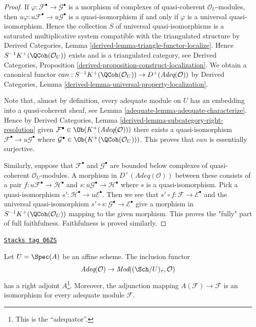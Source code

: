 \begin{proof}

If $\varphi : \mathcal{F}^\bullet \to \mathcal{G}^\bullet$
is a morphism of complexes of quasi-coherent
$\mathcal{O}_U$-modules, then $u\varphi : u\mathcal{F}^\bullet \to
u\mathcal{G}^\bullet$ is a quasi-isomorphism if and only if $\varphi$ is
a universal quasi-isomorphism. Hence the collection $S$
of universal quasi-isomorphisms is a saturated multiplicative
system compatible with the triangulated structure by
Derived Categories, Lemma \ref{derived-lemma-triangle-functor-localize}.
Hence $S^{-1}K^+(\QCoh(\mathcal{O}_U))$ exists and is a
triangulated category, see
Derived Categories, Proposition
\ref{derived-proposition-construct-localization}.
We obtain a canonical functor
$can : S^{-1}K^+(\QCoh(\mathcal{O}_U)) \to
D^{+}(\textit{Adeq}(\mathcal{O}))$ by
Derived Categories, Lemma \ref{derived-lemma-universal-property-localization}.

\medskip\noindent
Note that, almost by definition, every adequate module on $U$ has an
embedding into a quasi-coherent sheaf, see
Lemma \ref{adequate-lemma-adequate-characterize}. Hence by
Derived Categories, Lemma \ref{derived-lemma-subcategory-right-resolution}
given $\mathcal{F}^\bullet \in \Ob(K^+(\textit{Adeq}(\mathcal{O})))$
there exists a quasi-isomorphism
$\mathcal{F}^\bullet \to u\mathcal{G}^\bullet$
where $\mathcal{G}^\bullet \in \Ob(K^+(\QCoh(\mathcal{O}_U)))$.
This proves that $can$ is essentially surjective.

\medskip\noindent
Similarly, suppose that $\mathcal{F}^\bullet$ and $\mathcal{G}^\bullet$
are bounded below complexes of quasi-coherent $\mathcal{O}_U$-modules.
A morphism in $D^+(\textit{Adeq}(\mathcal{O}))$ between these
consists of a pair $f : u\mathcal{F}^\bullet \to \mathcal{H}^\bullet$
and $s : u\mathcal{G}^\bullet \to \mathcal{H}^\bullet$ where $s$
is a quasi-isomorphism. Pick a quasi-isomorphism
$s' : \mathcal{H}^\bullet \to u\mathcal{E}^\bullet$. Then we see that
$s' \circ f : \mathcal{F} \to \mathcal{E}^\bullet$ and the
universal quasi-isomorphism
$s' \circ s : \mathcal{G}^\bullet \to \mathcal{E}^\bullet$ give
a morphism in $S^{-1}K^{+}(\QCoh(\mathcal{O}_U))$ mapping
to the given morphism. This proves the "fully" part of full faithfulness.
Faithfulness is proved similarly.
\end{proof}

\begin{lemma}
\label{adequate-lemma-right-adjoint-adequate}
\href{https://stacks.math.columbia.edu/tag/06ZS}{\texttt{Stacks tag 06ZS}}

Let $U = \Spec(A)$ be an affine scheme.
The inclusion functor
$$
\textit{Adeq}(\mathcal{O}) \to
\textit{Mod}((\Sch/U)_\tau, \mathcal{O})
$$
has a right adjoint $A$\footnote{This is the ``adequator''.}.
Moreover, the adjunction mapping
$A(\mathcal{F}) \to \mathcal{F}$ is an isomorphism for every
adequate module $\mathcal{F}$.
\end{lemma}

